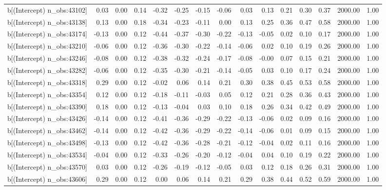 \begin{table}[ht]
\begin{tabular}{rrrrrrrrrrrrrrr}
  b[(Intercept) n\_obs:43102] & 0.03 & 0.00 & 0.14 & -0.32 & -0.25 & -0.15 & -0.06 & 0.03 & 0.13 & 0.21 & 0.30 & 0.37 & 2000.00 & 1.00 \\ 
  b[(Intercept) n\_obs:43138] & 0.13 & 0.00 & 0.18 & -0.34 & -0.23 & -0.11 & 0.00 & 0.13 & 0.25 & 0.36 & 0.47 & 0.58 & 2000.00 & 1.00 \\ 
  b[(Intercept) n\_obs:43174] & -0.13 & 0.00 & 0.12 & -0.44 & -0.37 & -0.30 & -0.22 & -0.13 & -0.05 & 0.02 & 0.10 & 0.17 & 2000.00 & 1.00 \\ 
  b[(Intercept) n\_obs:43210] & -0.06 & 0.00 & 0.12 & -0.36 & -0.30 & -0.22 & -0.14 & -0.06 & 0.02 & 0.10 & 0.19 & 0.26 & 2000.00 & 1.00 \\ 
  b[(Intercept) n\_obs:43246] & -0.08 & 0.00 & 0.12 & -0.38 & -0.32 & -0.24 & -0.17 & -0.08 & -0.00 & 0.07 & 0.15 & 0.21 & 2000.00 & 1.00 \\ 
  b[(Intercept) n\_obs:43282] & -0.06 & 0.00 & 0.12 & -0.35 & -0.30 & -0.21 & -0.14 & -0.05 & 0.03 & 0.10 & 0.17 & 0.24 & 2000.00 & 1.00 \\ 
  b[(Intercept) n\_obs:43318] & 0.29 & 0.00 & 0.12 & -0.02 & 0.06 & 0.14 & 0.21 & 0.30 & 0.38 & 0.45 & 0.53 & 0.58 & 2000.00 & 1.00 \\ 
  b[(Intercept) n\_obs:43354] & 0.12 & 0.00 & 0.12 & -0.18 & -0.11 & -0.03 & 0.05 & 0.12 & 0.21 & 0.28 & 0.36 & 0.43 & 2000.00 & 1.00 \\ 
  b[(Intercept) n\_obs:43390] & 0.18 & 0.00 & 0.12 & -0.13 & -0.04 & 0.03 & 0.10 & 0.18 & 0.26 & 0.34 & 0.42 & 0.49 & 2000.00 & 1.00 \\ 
  b[(Intercept) n\_obs:43426] & -0.14 & 0.00 & 0.12 & -0.41 & -0.36 & -0.29 & -0.22 & -0.13 & -0.06 & 0.02 & 0.09 & 0.16 & 2000.00 & 1.00 \\ 
  b[(Intercept) n\_obs:43462] & -0.14 & 0.00 & 0.12 & -0.42 & -0.36 & -0.29 & -0.22 & -0.14 & -0.06 & 0.01 & 0.09 & 0.15 & 2000.00 & 1.00 \\ 
  b[(Intercept) n\_obs:43498] & -0.13 & 0.00 & 0.12 & -0.42 & -0.36 & -0.28 & -0.21 & -0.12 & -0.04 & 0.02 & 0.11 & 0.16 & 2000.00 & 1.00 \\ 
  b[(Intercept) n\_obs:43534] & -0.04 & 0.00 & 0.12 & -0.33 & -0.26 & -0.20 & -0.12 & -0.04 & 0.04 & 0.10 & 0.19 & 0.22 & 2000.00 & 1.00 \\ 
  b[(Intercept) n\_obs:43570] & 0.03 & 0.00 & 0.12 & -0.26 & -0.19 & -0.12 & -0.05 & 0.03 & 0.12 & 0.18 & 0.26 & 0.31 & 2000.00 & 1.00 \\ 
  b[(Intercept) n\_obs:43606] & 0.29 & 0.00 & 0.12 & 0.00 & 0.06 & 0.14 & 0.21 & 0.29 & 0.38 & 0.44 & 0.52 & 0.59 & 2000.00 & 1.00 \\ 

\end{tabular}
\end{table}
